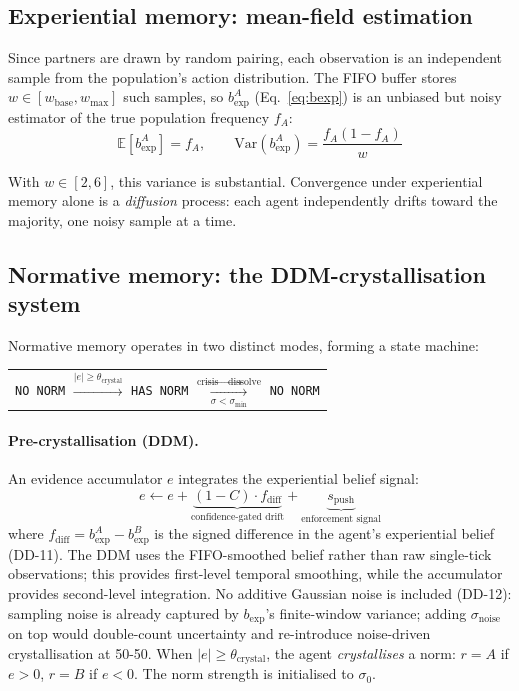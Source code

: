 \documentclass[11pt,a4paper]{article}
\begin{document}
\subsection{Experiential memory: mean-field estimation}
\label{sec:exp}

Since partners are drawn by random pairing, each observation is an independent sample from the population's action distribution. The FIFO buffer stores $w \in [w_{\mathrm{base}}, w_{\max}]$ such samples, so $b_{\exp}^A$ (Eq.~\ref{eq:bexp}) is an unbiased but noisy estimator of the true population frequency $f_A$:
\begin{equation}
\mathbb{E}[b_{\exp}^A] = f_A, \qquad \mathrm{Var}(b_{\exp}^A) = \frac{f_A(1 - f_A)}{w}
\end{equation}

With $w \in [2, 6]$, this variance is substantial. Convergence under experiential memory alone is a \emph{diffusion} process: each agent independently drifts toward the majority, one noisy sample at a time.

\subsection{Normative memory: the DDM-crystallisation system}
\label{sec:norm}

Normative memory operates in two distinct modes, forming a state machine:

\begin{center}
\begin{tabular}{@{}c@{}}
\texttt{NO NORM} $\xrightarrow{|e| \geq \theta_{\mathrm{crystal}}}$ \texttt{HAS NORM}
$\xrightarrow[\sigma < \sigma_{\min}]{\text{crisis} \to \text{dissolve}}$
\texttt{NO NORM}
\end{tabular}
\end{center}

\paragraph{Pre-crystallisation (DDM).} An evidence accumulator $e$ integrates the experiential belief signal:
\begin{equation}
e \leftarrow e + \underbrace{(1 - C) \cdot f_{\mathrm{diff}}}_{\text{confidence-gated drift}} + \underbrace{s_{\mathrm{push}}}_{\text{enforcement signal}}
\label{eq:ddm}
\end{equation}
where $f_{\mathrm{diff}} = b_{\exp}^A - b_{\exp}^B$ is the signed difference in the agent's experiential belief (DD-11). The DDM uses the FIFO-smoothed belief rather than raw single-tick observations; this provides first-level temporal smoothing, while the accumulator provides second-level integration. No additive Gaussian noise is included (DD-12): sampling noise is already captured by $b_{\exp}$'s finite-window variance; adding $\sigma_{\mathrm{noise}}$ on top would double-count uncertainty and re-introduce noise-driven crystallisation at 50-50. When $|e| \geq \theta_{\mathrm{crystal}}$, the agent \emph{crystallises} a norm: $r = A$ if $e > 0$, $r = B$ if $e < 0$. The norm strength is initialised to $\sigma_0$.
\end{document}
